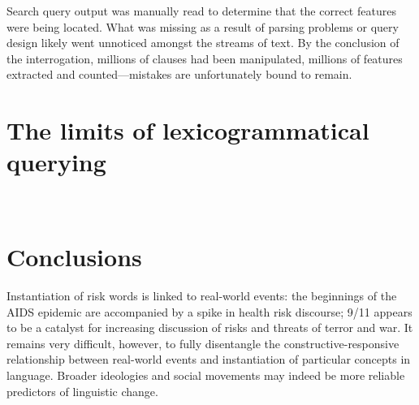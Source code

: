	 Search query output was manually read to determine that the correct features were being located. What was missing as a result of parsing problems or query design likely went unnoticed amongst the streams of text. By the conclusion of the interrogation, millions of clauses had been manipulated, millions of features extracted and counted---mistakes are unfortunately bound to remain.

\section{The limits of lexicogrammatical querying}

		~\ 

\section{Conclusions}

    Instantiation of risk words is linked to real-world events: the beginnings of the AIDS epidemic are accompanied by a spike in health risk discourse; 9\slash 11 appears to be a catalyst for increasing discussion of risks and threats of terror and war. It remains very difficult, however, to fully disentangle the constructive-responsive relationship between real-world events and instantiation of particular concepts in language. Broader ideologies and social movements may indeed be more reliable predictors of linguistic change.

